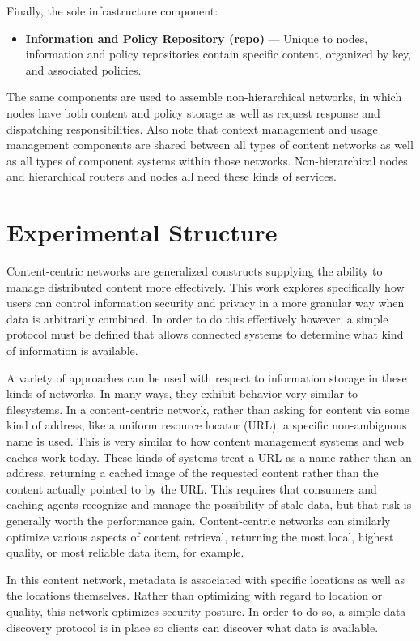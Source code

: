 Finally, the sole infrastructure component:

\begin{itemize}
\item \textbf{Information and Policy Repository (repo)} --- Unique to nodes, information and policy repositories contain specific content, organized by key, and associated policies.
\end{itemize}

The same components are used to assemble non-hierarchical networks, in which nodes have both content and policy storage as well as request response and dispatching responsibilities.  Also note that context management and usage management components are shared between all types of content networks as well as all types of component systems within those networks.  Non-hierarchical nodes and hierarchical routers and nodes all need these kinds of services.

\section{Experimental Structure}
Content-centric networks are generalized constructs supplying the ability to manage distributed content more effectively.  This work explores specifically how users can control information security and privacy in a more granular way when data is arbitrarily combined.  In order to do this effectively however, a simple protocol must be defined that allows connected systems to determine what kind of information is available.

A variety of approaches can be used with respect to information storage in these kinds of networks.  In many ways, they exhibit behavior very similar to filesystems.  In a content-centric network, rather than asking for content via some kind of address, like a uniform resource locator (URL), a specific non-ambiguous name is used.  This is very similar to how content management systems and web caches work today.  These kinds of systems treat a URL as a name rather than an address, returning a cached image of the requested content rather than the content actually pointed to by the URL.  This requires that consumers and caching agents recognize and manage the possibility of stale data, but that risk is generally worth the performance gain.  Content-centric networks can similarly optimize various aspects of content retrieval, returning the most local, highest quality, or most reliable data item, for example.

In this content network, metadata is associated with specific locations as well as the locations themselves.  Rather than optimizing with regard to location or quality, this network optimizes security posture.  In order to do so, a simple data discovery protocol is in place so clients can discover what data is available.

